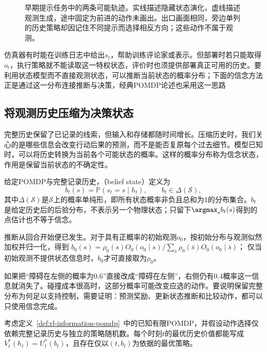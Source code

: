 \begin{figure}[htbp]
  \centering
  
  \caption{早期提示任务中的两条可能轨迹。实线描述隐藏状态演化，虚线描述观测生成，途中固定为前进的动作未画出。出口画面相同，旁边单列的历史策略却因记住不同提示而选择相反方向；这些动作不属于观测。}
  \label{fig:rl-information-aliasing}
\end{figure}

仿真器有时能在训练日志中给出$s_t$，帮助训练评论家或表示。但部署时若只能取得$o_t$，执行策略就不能读取这一特权状态，评价时也须提供部署真正可用的历史。要利用状态模型而不直接观测状态，可以推断当前状态的概率分布；下面的信念方法正是通过这一分布连接推断与决策，经典POMDP论述也采用这一思路

\subsection{将观测历史压缩为决策状态}
\label{sec:rl-information-sufficiency}

完整历史保留了已记录的线索，但输入和存储都随时间增长。压缩历史时，我们关心的是哪些信息会改变行动后果的预测，而不是能否复原每个过去细节。模型已知时，可以将历史转换为当前各个可能状态的概率。这样的概率分布称为信念状态，作用是保留当前状态的不确定性。

\begin{definition}[信念状态]
  \label{def:rl-information-belief}
  给定POMDP与完整记录历史，（belief state）定义为
  \[
    b_t(s)=\mathbb P(s_t=s\mid h_t),\qquad
    b_t\in\Delta(\mathcal S),
  \]
  其中$\Delta(\mathcal S)$是$\mathcal S$上的概率单纯形，即所有状态概率非负且总和为1的分布集合。$b_t$是给定历史后的后验分布，不表示另一个物理状态；只留下$\argmax_s b_t(s)$得到的点估计也不等于信念。
\end{definition}

推断从回合开始便已发生。对于具有正概率的初始观测$o_0$，按初始分布与观测似然加权并归一化，得到
$b_0(s)=\rho_0(s)O_0(o_0\mid s)/\sum_{\bar s}\rho_0(\bar s)O_0(o_0\mid\bar s)$；
仅当初始观测不提供状态信息时，$b_0$才可直接取为$\rho_0$。

如果把“障碍在左侧的概率为0.6”直接改成“障碍在左侧”，右侧仍有0.4概率这一信息就消失了。碰撞成本很高时，这部分概率可能改变应选的动作。要说明保留完整分布为何足以支持控制，需要证明：预测奖励、更新状态推断和比较动作，都可以只使用信念完成。

\begin{theorem}[精确信念对最优控制充分]
  \label{thm:rl-information-belief-sufficient}
  考虑定义~\ref{def:rl-information-pomdp}~中的已知有限POMDP，并假设动作选择仅依赖完整记录历史与独立的策略随机数。每个时刻$t$的最优历史价值都能写成$V_t^*(h_t)=U_t^*(b_t)$，且存在仅以$(t,b_t)$为依据的最优策略。
\end{theorem}

